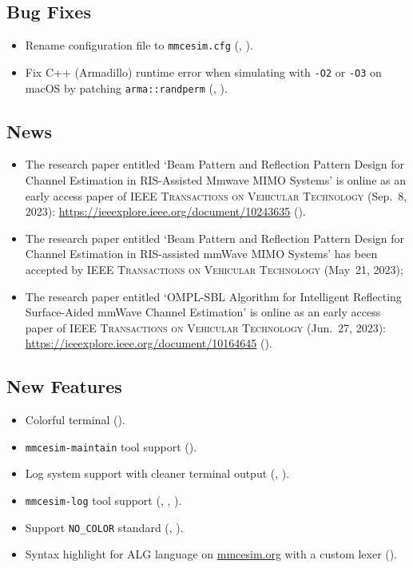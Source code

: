 \subsection*{Bug Fixes}
\begin{itemize}
  \item Rename configuration file to \texttt{mmcesim.cfg} (, ).
  \item Fix C++ (Armadillo) runtime error when simulating with \texttt{-O2} or \texttt{-O3} on macOS by patching \texttt{arma::randperm} (, ).
\end{itemize}
\subsection*{News}
\begin{itemize}
  \item The research paper entitled `Beam Pattern and Reflection Pattern Design for Channel Estimation in RIS-Assisted Mmwave MIMO Systems' \cite{you2023beam} is online as an early access paper of \textsc{IEEE Transactions on Vehicular Technology} (Sep.~8, 2023): \url{https://ieeexplore.ieee.org/document/10243635} ().
  \item The research paper entitled `Beam Pattern and Reflection Pattern Design for Channel Estimation in RIS-assisted mmWave MIMO Systems' \cite{you2023beam} has been accepted by \textsc{IEEE Transactions on Vehicular Technology} (May~21, 2023);
  \item The research paper entitled `OMPL-SBL Algorithm for Intelligent Reflecting Surface-Aided mmWave Channel Estimation' \cite{zhao2023ompl} is online as an early access paper of \textsc{IEEE Transactions on Vehicular Technology} (Jun.~27, 2023): \url{https://ieeexplore.ieee.org/document/10164645} ().
\end{itemize}

\subsection*{New Features}
\begin{itemize}
  \item Colorful terminal ().
  \item \texttt{mmcesim-maintain} tool support ().
  \item Log system support with cleaner terminal output (, ).
  \item \texttt{mmcesim-log} tool support (, , ).
  \item Support \texttt{NO\_COLOR} standard (, ).
  \item Syntax highlight for ALG language on \href{https://mmcesim.org}{mmcesim.org} with a custom lexer ().
\end{itemize}
